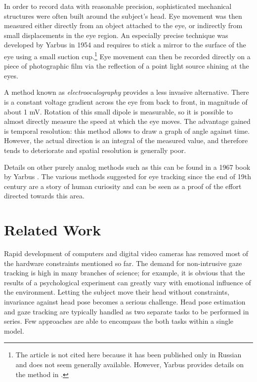 In order to record data with reasonable precision, sophisticated mechanical structures were often built around the subject's head.
Eye movement was then measured either directly from an object attached to the eye, or indirectly from small displacements in the eye region.
An especially precise technique was developed by Yarbus in 1954 and requires to stick a mirror to the surface of the eye using a small suction cup.\footnote{
The article is not cited here because it has been published only in Russian and does not seem generally available.
However, Yarbus provides details on the method in \cite{yarbus1967}.
}
Eye movement can then be recorded directly on a piece of photographic film via the reflection of a point light source shining at the eyes.

A method known as \textit{electrooculography} provides a less invasive alternative.
There is a constant voltage gradient across the eye from back to front, in magnitude of about 1 mV.
Rotation of this small dipole is measurable, so it is possible to almost directly measure the speed at which the eye moves.
The advantage gained is temporal resolution: this method allows to draw a graph of angle against time.
However, the actual direction is an integral of the measured value, and therefore tends to deteriorate and spatial resolution is generally poor.

Details on other purely analog methods such as this can be found in a 1967 book by Yarbus \cite{yarbus1967}.
The various methods suggested for eye tracking since the end of 19th century are a story of human curiosity and can be seen as a proof of the effort directed towards this area.

\section{Related Work}

Rapid development of computers and digital video cameras has removed most of the hardware constraints mentioned so far.
The demand for non-intrusive gaze tracking is high in many branches of science; for example, it is obvious that the results of a psychological experiment can greatly vary with emotional influence of the environment.
Letting the subject move their head without constraints, invariance against head pose becomes a serious challenge.
Head pose estimation and gaze tracking are typically handled as two separate tasks to be performed in series.
Few approaches are able to encompass the both tasks within a single model.

